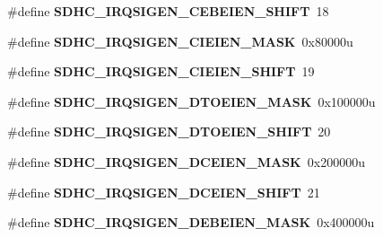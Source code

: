\begin{DoxyCompactItemize}
\item 
\#define {\bfseries S\+D\+H\+C\+\_\+\+I\+R\+Q\+S\+I\+G\+E\+N\+\_\+\+C\+E\+B\+E\+I\+E\+N\+\_\+\+S\+H\+I\+FT}~18\hypertarget{group__SDHC__Register__Masks_ga1b7ce68e7e1e9354fd70b85ffe1625a1}{}\label{group__SDHC__Register__Masks_ga1b7ce68e7e1e9354fd70b85ffe1625a1}

\item 
\#define {\bfseries S\+D\+H\+C\+\_\+\+I\+R\+Q\+S\+I\+G\+E\+N\+\_\+\+C\+I\+E\+I\+E\+N\+\_\+\+M\+A\+SK}~0x80000u\hypertarget{group__SDHC__Register__Masks_ga3a09f7cd7b41c260dd89ea77a1511005}{}\label{group__SDHC__Register__Masks_ga3a09f7cd7b41c260dd89ea77a1511005}

\item 
\#define {\bfseries S\+D\+H\+C\+\_\+\+I\+R\+Q\+S\+I\+G\+E\+N\+\_\+\+C\+I\+E\+I\+E\+N\+\_\+\+S\+H\+I\+FT}~19\hypertarget{group__SDHC__Register__Masks_gae0d92453706b49294eac23eb53e2c742}{}\label{group__SDHC__Register__Masks_gae0d92453706b49294eac23eb53e2c742}

\item 
\#define {\bfseries S\+D\+H\+C\+\_\+\+I\+R\+Q\+S\+I\+G\+E\+N\+\_\+\+D\+T\+O\+E\+I\+E\+N\+\_\+\+M\+A\+SK}~0x100000u\hypertarget{group__SDHC__Register__Masks_ga16c82f46bb0de77ecd32731d597843e4}{}\label{group__SDHC__Register__Masks_ga16c82f46bb0de77ecd32731d597843e4}

\item 
\#define {\bfseries S\+D\+H\+C\+\_\+\+I\+R\+Q\+S\+I\+G\+E\+N\+\_\+\+D\+T\+O\+E\+I\+E\+N\+\_\+\+S\+H\+I\+FT}~20\hypertarget{group__SDHC__Register__Masks_ga0d5615f1a4d2d1e8f8897fefbf7c1366}{}\label{group__SDHC__Register__Masks_ga0d5615f1a4d2d1e8f8897fefbf7c1366}

\item 
\#define {\bfseries S\+D\+H\+C\+\_\+\+I\+R\+Q\+S\+I\+G\+E\+N\+\_\+\+D\+C\+E\+I\+E\+N\+\_\+\+M\+A\+SK}~0x200000u\hypertarget{group__SDHC__Register__Masks_ga9993e87c1ebc32e1bf8b58af1460f470}{}\label{group__SDHC__Register__Masks_ga9993e87c1ebc32e1bf8b58af1460f470}

\item 
\#define {\bfseries S\+D\+H\+C\+\_\+\+I\+R\+Q\+S\+I\+G\+E\+N\+\_\+\+D\+C\+E\+I\+E\+N\+\_\+\+S\+H\+I\+FT}~21\hypertarget{group__SDHC__Register__Masks_gae8c36f54cd9d4e06778ddea141252fb5}{}\label{group__SDHC__Register__Masks_gae8c36f54cd9d4e06778ddea141252fb5}

\item 
\#define {\bfseries S\+D\+H\+C\+\_\+\+I\+R\+Q\+S\+I\+G\+E\+N\+\_\+\+D\+E\+B\+E\+I\+E\+N\+\_\+\+M\+A\+SK}~0x400000u\hypertarget{group__SDHC__Register__Masks_gac596000fbd2ef20a87022ab4abbeb74a}{}\label{group__SDHC__Register__Masks_gac596000fbd2ef20a87022ab4abbeb74a}


\end{DoxyCompactItemize}
